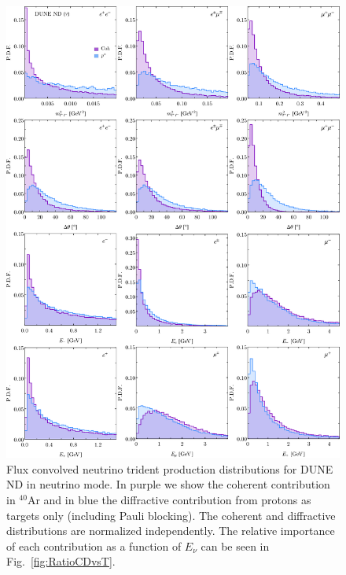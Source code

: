 \begin{figure}[H]
\centering
\includegraphics[width=\textwidth]{figs/DUNE_nu_3horn_mll_theta_E.pdf}
\caption{Flux convolved neutrino trident production distributions for DUNE ND in neutrino mode. In purple we show the coherent contribution in $^{40}$Ar and in blue the diffractive contribution from protons as targets only (including Pauli blocking). The coherent and diffractive distributions are normalized independently. The relative importance of each contribution as a function of $E_\nu$
can be seen in Fig.~\ref{fig:RatioCDvsT}.
%
\label{fig:DUNE_ND_dist}}
\end{figure}
%
